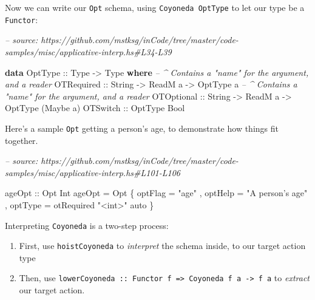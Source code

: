 \documentclass[]{article}
\newenvironment{Shaded}{}{}
\newcommand{\CommentTok}[1]{\textcolor[rgb]{0.38,0.63,0.69}{\textit{#1}}}
\newcommand{\DataTypeTok}[1]{\textcolor[rgb]{0.56,0.13,0.00}{#1}}
\newcommand{\FunctionTok}[1]{\textcolor[rgb]{0.02,0.16,0.49}{#1}}
\newcommand{\KeywordTok}[1]{\textcolor[rgb]{0.00,0.44,0.13}{\textbf{#1}}}
\newcommand{\NormalTok}[1]{#1}
\newcommand{\OtherTok}[1]{\textcolor[rgb]{0.00,0.44,0.13}{#1}}
\newcommand{\StringTok}[1]{\textcolor[rgb]{0.25,0.44,0.63}{#1}}
\begin{document}
Now we can write our \texttt{Opt} schema, using \texttt{Coyoneda\ OptType} to
let our type be a \texttt{Functor}:

\begin{Shaded}
\begin{Highlighting}[]
\CommentTok{-- source: https://github.com/mstksg/inCode/tree/master/code-samples/misc/applicative-interp.hs#L34-L39}

\KeywordTok{data} \DataTypeTok{OptType}\OtherTok{ ::} \DataTypeTok{Type} \OtherTok{->} \DataTypeTok{Type} \KeywordTok{where}
    \CommentTok{-- ^ Contains a "name" for the argument, and a reader}
    \DataTypeTok{OTRequired}\OtherTok{ ::} \DataTypeTok{String} \OtherTok{->} \DataTypeTok{ReadM}\NormalTok{ a }\OtherTok{->} \DataTypeTok{OptType}\NormalTok{ a}
    \CommentTok{-- ^ Contains a "name" for the argument, and a reader}
    \DataTypeTok{OTOptional}\OtherTok{ ::} \DataTypeTok{String} \OtherTok{->} \DataTypeTok{ReadM}\NormalTok{ a }\OtherTok{->} \DataTypeTok{OptType}\NormalTok{ (}\DataTypeTok{Maybe}\NormalTok{ a)}
    \DataTypeTok{OTSwitch}\OtherTok{   ::} \DataTypeTok{OptType} \DataTypeTok{Bool}
\end{Highlighting}
\end{Shaded}

Here's a sample \texttt{Opt} getting a person's age, to demonstrate how things
fit together.

\begin{Shaded}
\begin{Highlighting}[]
\CommentTok{-- source: https://github.com/mstksg/inCode/tree/master/code-samples/misc/applicative-interp.hs#L101-L106}

\OtherTok{ageOpt ::} \DataTypeTok{Opt} \DataTypeTok{Int}
\NormalTok{ageOpt }\FunctionTok{=} \DataTypeTok{Opt}
\NormalTok{    \{ optFlag }\FunctionTok{=} \StringTok{"age"}
\NormalTok{    , optHelp }\FunctionTok{=} \StringTok{"A person's age"}
\NormalTok{    , optType }\FunctionTok{=}\NormalTok{ otRequired }\StringTok{"<int>"}\NormalTok{ auto}
\NormalTok{    \}}
\end{Highlighting}
\end{Shaded}

Interpreting \texttt{Coyoneda} is a two-step process:

\begin{enumerate}
\def\labelenumi{\arabic{enumi}.}
\tightlist
\item
  First, use \texttt{hoistCoyoneda} to \emph{interpret} the schema inside, to
  our target action type
\item
  Then, use
  \texttt{lowerCoyoneda\ ::\ Functor\ f\ =\textgreater{}\ Coyoneda\ f\ a\ -\textgreater{}\ f\ a}
  to \emph{extract} our target action.
\end{enumerate}
\end{document}
